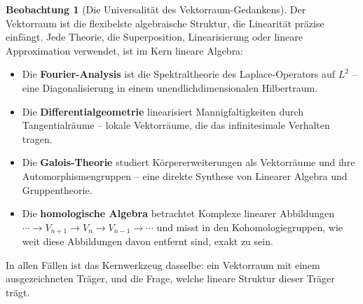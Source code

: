 ﻿\documentclass[a4paper,12pt]{report}
\theoremstyle{definition}
\newtheorem{beobachtung}{Beobachtung}
\begin{document}
\begin{beobachtung}[Die Universalität des Vektorraum-Gedankens]
    Der Vektorraum ist die flexibelste algebraische Struktur, die
    Linearität präzise einfängt. Jede Theorie, die Superposition,
    Linearisierung oder lineare Approximation verwendet, ist im
    Kern lineare Algebra:
    \begin{itemize}
        \item[-] Die \textbf{Fourier-Analysis} ist die
              Spektraltheorie des Laplace-Operators auf $L^2$ --
              eine Diagonalisierung in einem unendlichdimensionalen
              Hilbertraum.
        \item[-] Die \textbf{Differentialgeometrie} linearisiert
              Mannigfaltigkeiten durch Tangentialräume -- lokale
              Vektorräume, die das infinitesimale Verhalten tragen.
        \item[-] Die \textbf{Galois-Theorie} studiert Körpererweiterungen
              als Vektorräume und ihre Automorphismengruppen -- eine
              direkte Synthese von Linearer Algebra und Gruppentheorie.
        \item[-] Die \textbf{homologische Algebra} betrachtet Komplexe
              linearer Abbildungen $\cdots \to V_{n+1} \to V_n \to
              V_{n-1} \to \cdots$ und misst in den Kohomologiegruppen,
              wie weit diese Abbildungen davon entfernt sind, exakt
              zu sein.
    \end{itemize}
    In allen Fällen ist das Kernwerkzeug dasselbe: ein Vektorraum
    mit einem ausgezeichneten Träger, und die Frage, welche
    lineare Struktur dieser Träger trägt.
\end{beobachtung}
\end{document}
